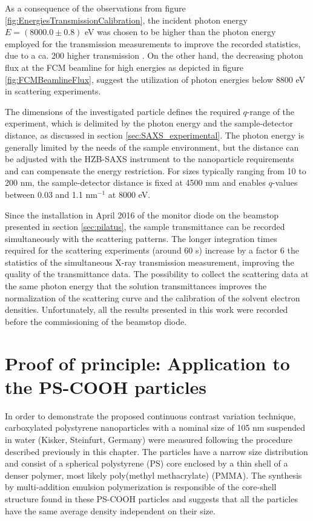 As a consequence of the observations from figure \ref{fig:EnergiesTransmissionCalibration}, the incident photon energy \(E = \left(8000.0  \pm 0.8\right)\) eV was chosen to be higher than the photon energy employed for the transmission measurements to improve the recorded statistics, due to a ca. 200 higher transmission \citep{henke_x-ray_1993}. On the other hand, the decreasing photon flux at the FCM beamline for high energies as depicted in figure \ref{fig:FCMBeamlineFlux}, suggest the utilization of photon energies below 8800 eV in scattering experiments.

The dimensions of the investigated particle defines the required $q$-range of the experiment, which is delimited by the photon energy and the sample-detector distance, as discussed in section \ref{sec:SAXS_experimental}. The photon energy is generally limited by the needs of the sample environment, but the distance can be adjusted with the HZB-SAXS instrument to the nanoparticle requirements and can compensate the energy restriction. For sizes typically ranging from 10 to 200 nm, the sample-detector distance is fixed at 4500 mm and enables $q$-values between 0.03 and 1.1 nm$^{-1}$ at 8000 eV.

Since the installation in April 2016 of the monitor diode on the beamstop presented in section \ref{sec:pilatus}, the sample transmittance can be recorded simultaneously with the scattering patterns. The longer integration times required for the scattering experiments (around 60 s) increase by a factor 6 the statistics of the simultaneous X-ray transmission measurement, improving the quality of the transmittance data. The possibility to collect the scattering data at the same photon energy that the solution transmittances improves the normalization of the scattering curve and the calibration of the solvent electron densities. Unfortunately, all the results presented in this work were recorded before the commissioning of the beamstop diode.

\section{Proof of principle: Application to the PS-COOH particles}
\label{sec:KiskerResults}

In order to demonstrate the proposed continuous contrast variation technique, carboxylated polystyrene nanoparticles with a nominal size of 105 nm suspended in water (Kisker, Steinfurt, Germany) were measured following the procedure described previously in this chapter. The particles have a narrow size distribution and consist of a spherical polystyrene (PS) core enclosed by a thin shell of a denser polymer, most likely poly(methyl methacrylate) (PMMA). The synthesis by multi-addition emulsion polymerization is responsible of the core-shell structure found in these PS-COOH particles and suggests that all the particles have the same average density independent on their size.

